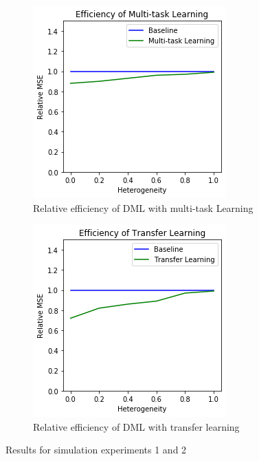 \documentclass[12pt]{article}
\begin{document}
\begin{figure}[h!]
	\centering
	\begin{subfigure}{.4\textwidth}
		\centering
		\includegraphics[width=\linewidth]{fig1.png}
		\caption{Relative efficiency of DML with multi-task Learning}
		\label{fig:sub1}
	\end{subfigure}\hfill
	\begin{subfigure}{.4\textwidth}
		\centering
		\includegraphics[width=\linewidth]{fig2.png}
		\caption{Relative efficiency of DML with transfer learning}
		\label{fig:sub2}
	\end{subfigure}
	\caption{Results for simulation experiments 1 and 2}
	\label{fig:sim1}
\end{figure}
\end{document}
